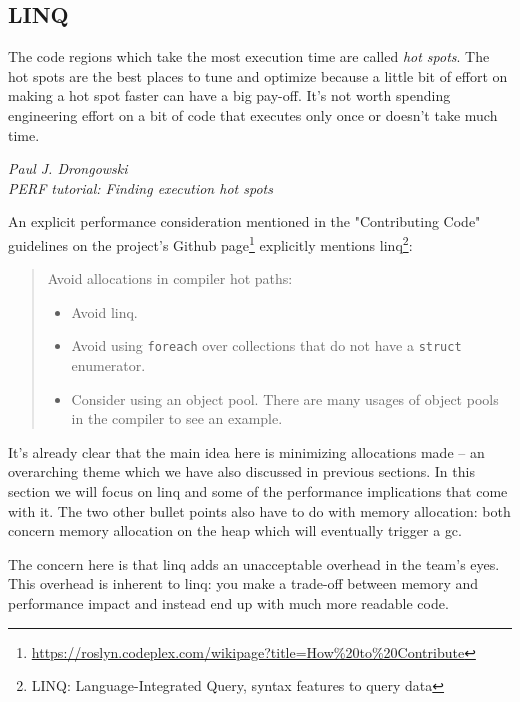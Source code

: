 \newpage
\subsection{LINQ}
\label{sec:linq}

\epigraph{The code regions which take the most execution time are called \textit{hot spots}. The hot spots are the best places to tune and optimize because a little bit of effort on making a hot spot faster can have a big pay-off. It’s not worth spending engineering effort on a bit of code that executes only once or doesn’t take much time.}
{\textit{Paul J. Drongowski \\ \footnotesize{PERF tutorial: Finding execution hot spots\protect\footnotemark}}}


An explicit performance consideration mentioned in the "Contributing Code" guidelines on the project's Github page\footnote{\url{https://roslyn.codeplex.com/wikipage?title=How\%20to\%20Contribute}} explicitly mentions \gls{linq}\footnote{LINQ: Language-Integrated Query, syntax features to query data}:

\begin{quote}
Avoid allocations in \gls{compiler} hot paths:
\begin{itemize}
\item Avoid \gls{linq}.
\item Avoid using \texttt{foreach} over collections that do not have a \texttt{struct} enumerator.
\item Consider using an object pool. There are many usages of object pools in the \gls{compiler} to see an example.
\end{itemize}
\end{quote}

It's already clear that the main idea here is minimizing allocations made -- an overarching theme which we have also discussed in previous sections. In this section we will focus on \gls{linq} and some of the performance implications that come with it. The two other bullet points also have to do with memory allocation: both concern memory allocation on the heap which will eventually trigger a \gls{gc}.

The concern here is that \gls{linq} adds an unacceptable overhead in the team's eyes. This overhead is inherent to \gls{linq}: you make a trade-off between memory and performance impact and instead end up with much more readable code. 

